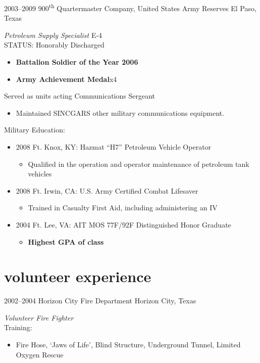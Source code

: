 \documentclass[]{friggeri-cv} %
\begin{document}
\begin{entrylist}
\entry
{2003--2009}
{900\textsuperscript{th} Quartermaster Company, United States Army Reserves}
{El Paso, Texas}
{\emph{Petroleum Supply Specialist} E-4 \\
STATUS: Honorably Discharged
\begin{itemize}
\item \textbf{Battalion Soldier of the Year 2006}
\item \textbf{Army Achievement Medal}x4
\end{itemize}
Served as units acting Communications Sergeant
\begin{itemize}
\item Maintained SINCGARS other military communications equipment.
\end{itemize}
Military Education:
\begin{itemize}
\item 2008 Ft. Knox, KY: Hazmat “H7” Petroleum Vehicle Operator
\begin{itemize}
\item Qualified in the operation and operator maintenance of petroleum tank vehicles
\end{itemize}
\item 2008 Ft. Irwin, CA: U.S. Army Certified Combat Lifesaver
\begin{itemize}
\item Trained in Casualty First Aid, including administering an IV
\end{itemize}
\item 2004 Ft. Lee, VA: AIT MOS 77F/92F Distinguished Honor Graduate
\begin{itemize}
\item \textbf{Highest GPA of class}
\end{itemize}
\end{itemize}}
\end{entrylist}



\section{volunteer experience}

\begin{entrylist}
\entry
{2002--2004}
{Horizon City Fire Department}
{Horizon City, Texas}
{\emph{Volunteer Fire Fighter} \\
Training:
\begin{itemize}
\item Fire Hose, ‘Jaws of Life’, Blind Structure, Underground Tunnel, Limited Oxygen Rescue
\end{itemize}}
\end{entrylist}
\end{document}

